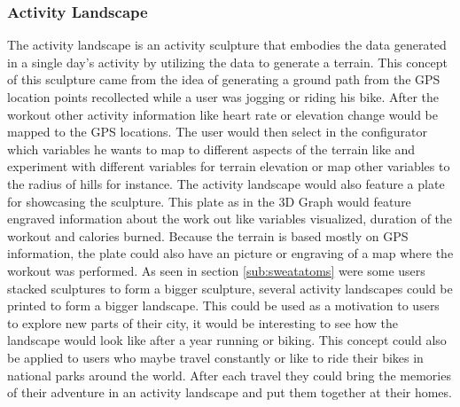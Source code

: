 \documentclass[../medieninformatik-arbeit.tex]{subfiles}
\begin{document}
\subsubsection{Activity Landscape}
The activity landscape is an activity sculpture that embodies the data generated in a single day's activity by utilizing the data to generate a terrain. This concept of this sculpture came from the idea of generating a ground path from the GPS location points recollected while a user was jogging or riding his bike. After the workout other activity information like heart rate or elevation change would be mapped to the GPS locations. The user would then select in the configurator which variables he wants to map to different aspects of the terrain like and experiment with different variables for terrain elevation or map other variables to the radius of hills for instance. The activity landscape would also feature a plate for showcasing the sculpture. This plate as in the 3D Graph would feature engraved information about the work out like variables visualized, duration of the workout and calories burned. Because the terrain is based mostly on GPS information, the plate could also have an picture or engraving of a map where the workout was performed. As seen in section \ref{sub:sweatatoms} were some users stacked sculptures to form a bigger sculpture, several activity landscapes could be printed to form a bigger landscape. This could be used as a motivation to users to explore new parts of their city, it would be interesting to see how the landscape would look like after a year running or biking. This concept could also be applied to users who maybe travel constantly or like to ride their bikes in national parks around the world. After each travel they could bring the memories of their adventure in an activity landscape and put them together at their homes. 
\end{document}
